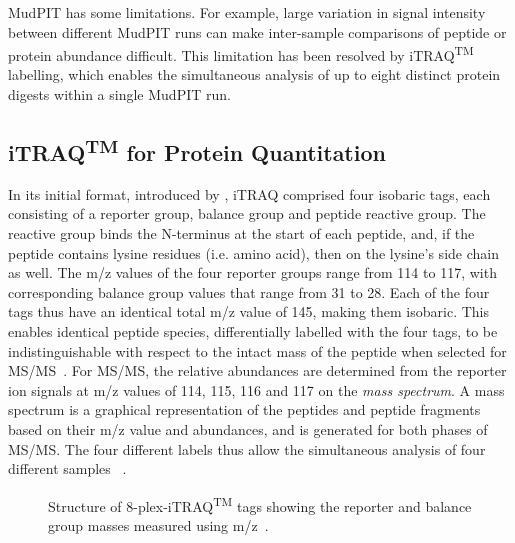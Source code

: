 \documentclass[11pt,a4paper]{article}
\begin{document}
MudPIT has some limitations. For example, large variation in signal intensity between different MudPIT runs can make inter-sample comparisons of peptide or protein abundance difficult. This limitation has been resolved by iTRAQ\textsuperscript{TM} labelling, which enables the simultaneous analysis of up to eight distinct protein digests within a single MudPIT run.

\subsection{iTRAQ\textsuperscript{TM} for Protein Quantitation}\label{subsec:iTRAQ}
In its initial format, introduced by \cite{Ross2004}, iTRAQ comprised four isobaric tags, each consisting of a reporter group, balance group and peptide reactive group. The reactive group binds the N-terminus at the start of each peptide, and, if the peptide contains lysine residues (i.e. amino acid), then on the lysine's side chain as well. The m/z values of the four reporter groups range from 114 to 117, with corresponding balance group values that range from 31 to 28. Each of the four tags thus have an identical total m/z value of 145, making them isobaric. This enables identical peptide species, differentially labelled with the four tags, to be indistinguishable with respect to the intact mass of the peptide when selected for MS/MS~\citep{Ross2004}. For MS/MS, the relative abundances are determined from the reporter ion signals at m/z values of 114, 115, 116 and 117 on the \emph{mass spectrum}. A mass spectrum is a graphical representation of the peptides and peptide fragments based on their m/z value and abundances, and is generated for both phases of MS/MS. The four different labels thus allow the simultaneous analysis of four different samples ~\citep{Ross2004}.
  
\begin{figure}[htb]
\caption{Structure of 8-plex-iTRAQ\textsuperscript{TM} tags showing the reporter and balance group masses measured using m/z~\citep{Choe2007}.}
\label{fig:8-plex}
\end{figure}
\end{document}
